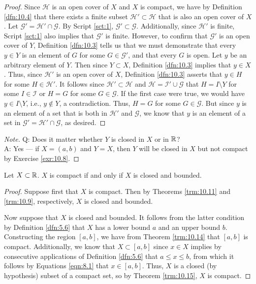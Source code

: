 \documentclass[../main.tex]{subfiles}
\begin{document}
\begin{theorem}
\begin{proof}
        Since $\mathcal{H}$ is an open cover of $X$ and $X$ is compact, we have by Definition \ref{dfn:10.4} that there exists a finite subset $\mathcal{H}'\subset\mathcal{H}$ that is also an open cover of $X$. Let $\mathcal{G}'=\mathcal{H}'\cap\mathcal{G}$. By Script \ref{sct:1}, $\mathcal{G}'\subset\mathcal{G}$. Additionally, since $\mathcal{H}'$ is finite, Script \ref{sct:1} also implies that $\mathcal{G}'$ is finite. However, to confirm that $\mathcal{G}'$ is an open cover of $Y$, Definition \ref{dfn:10.3} tells us that we must demonstrate that every $y\in Y$ is an element of $G$ for some $G\in\mathcal{G}'$, and that every $G$ is open. Let $y$ be an arbitrary element of $Y$. Then since $Y\subset X$, Definition \ref{dfn:10.3} implies that $y\in X$. Thus, since $\mathcal{H}'$ is an open cover of $X$, Definition \ref{dfn:10.3} asserts that $y\in H$ for some $H\in\mathcal{H}'$. It follows since $\mathcal{H}'\subset\mathcal{H}$ and $\mathcal{H}=\mathcal{I}'\cup\mathcal{G}$ that $H=I\setminus Y$ for some $I\in\mathcal{I}$ or $H=G$ for some $G\in\mathcal{G}$. If the first case were true, we would have $y\in I\setminus Y$, i.e., $y\notin Y$, a contradiction. Thus, $H=G$ for some $G\in\mathcal{G}$. But since $y$ is an element of a set that is both in $\mathcal{H}'$ and $\mathcal{G}$, we know that $y$ is an element of a set in $\mathcal{G}'=\mathcal{H}'\cap\mathcal{G}$, as desired.
    \end{proof}
    \begin{proof}[Note]
        Q: Does it matter whether $Y$ is closed in $X$ or in $\mathbb{R}$?\\
        A: Yes --- if $X=(a,b)$ and $Y=X$, then $Y$ will be closed in $X$ but not compact by Exercise \ref{exr:10.8}.
    \end{proof}
\end{theorem}

\begin{theorem}\label{trm:10.16}
    Let $X\subset\mathbb{R}$. $X$ is compact if and only if $X$ is closed and bounded.
    \begin{proof}
        Suppose first that $X$ is compact. Then by Theorems \ref{trm:10.11} and \ref{trm:10.9}, respectively, $X$ is closed and bounded.\par
        Now suppose that $X$ is closed and bounded. It follows from the latter condition by Definition \ref{dfn:5.6} that $X$ has a lower bound $a$ and an upper bound $b$. Constructing the region $[a,b]$, we have from Theorem \ref{trm:10.14} that $[a,b]$ is compact. Additionally, we know that $X\subset[a,b]$ since $x\in X$ implies by consecutive applications of Definition \ref{dfn:5.6} that $a\leq x\leq b$, from which it follows by Equations \ref{eqn:8.1} that $x\in[a,b]$. Thus, $X$ is a closed (by hypothesis) subset of a compact set, so by Theorem \ref{trm:10.15}, $X$ is compact.
    \end{proof}
\end{theorem}
\end{document}
